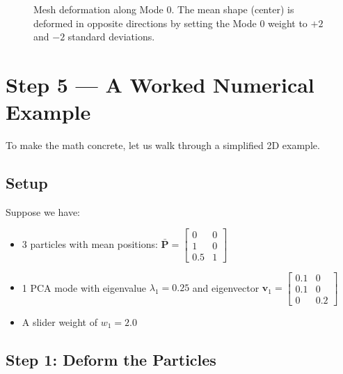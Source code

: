 \documentclass[12pt,a4paper]{article}
\begin{document}
\begin{figure}[H]
    \centering
    \caption{Mesh deformation along Mode 0. The mean shape (center) is deformed in opposite directions by setting the Mode 0 weight to $+2$ and $-2$ standard deviations.}
    \label{fig:deformation_comparison}
\end{figure}

\section{Step 5 --- A Worked Numerical Example}

To make the math concrete, let us walk through a simplified 2D example.

\subsection{Setup}

Suppose we have:
\begin{itemize}
    \item 3 particles with mean positions: $\bar{\mathbf{P}} = \begin{bmatrix} 0 & 0 \\ 1 & 0 \\ 0.5 & 1 \end{bmatrix}$
    \item 1 PCA mode with eigenvalue $\lambda_1 = 0.25$ and eigenvector $\mathbf{v}_1 = \begin{bmatrix} 0.1 & 0 \\ 0.1 & 0 \\ 0 & 0.2 \end{bmatrix}$
    \item A slider weight of $w_1 = 2.0$
\end{itemize}

\subsection{Step 1: Deform the Particles}
\end{document}
